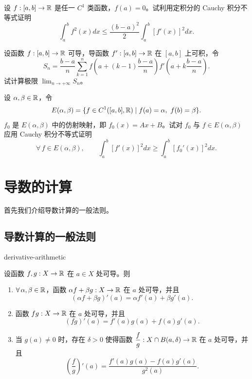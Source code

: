 \begin{exercise}
	\item 设 \(f:[a,b]\to\mathbb{R}\) 是任一 \(C^1\) 类函数，\(f(a)=0\)。试利用定积分的 Cauchy 积分不等式证明
	\[
	\int_a^b f^2(x)dx\le\frac{(b-a)^2}{2}\int_a^b[f'(x)]^2dx.
	\]
\end{exercise}

\begin{exercise}
	\item 设函数 \(f:[a,b]\to\mathbb{R}\) 可导，导函数 \(f':[a,b]\to\mathbb{R}\) 在 \([a,b]\) 上可积，令
	\[
	S_n=\frac{b-a}{n}\sum_{k=1}^n f\left(a+(k-1)\frac{b-a}{n}\right)f'\left(a+k\frac{b-a}{n}\right).
	\]
	试计算极限 \(\displaystyle\lim_{n\to+\infty}S_n\)。
\end{exercise}

\begin{exercise}
	\item 设 \(\alpha,\beta\in\mathbb{R}\)，令
	\[
	E(\alpha,\beta)=\{f\in C^1([a,b],\mathbb{R})\mid f(a)=\alpha,\ f(b)=\beta\}.
	\]
	\(f_0\) 是 \(E(\alpha,\beta)\) 中的仿射映射，即 \(f_0(x)=Ax+B\)。试对 \(f_0\) 与 \(f\in E(\alpha,\beta)\) 应用 Cauchy 积分不等式证明
	\[
	\forall\,f\in E(\alpha,\beta),\qquad\int_a^b[f'(x)]^2dx\ge\int_a^b[f_0'(x)]^2dx.
	\]
\end{exercise}

\section{导数的计算}

首先我们介绍导数计算的一般法则。

\subsection{导数计算的一般法则}
	\label{sec:6-2-1}

\begin{mythm}{}{derivative-arithmetic}

	设函数 \(f,g:X\to\mathbb{R}\) 在 \(a\in X\) 处可导。则

	\begin{enumerate}[label=\arabic*)]
		\item \(\forall\,\alpha,\beta\in\mathbb{R}\)，函数 \(\alpha f+\beta g:X\to\mathbb{R}\) 在 \(a\) 处可导，并且
		\[
		(\alpha f+\beta g)'(a)=\alpha f'(a)+\beta g'(a).
		\]

		\item 函数 \(fg:X\to\mathbb{R}\) 在 \(a\) 处可导，并且
		\[
		(fg)'(a)=f'(a)g(a)+f(a)g'(a).
		\]

		\item 当 \(g(a)\neq0\) 时，存在 \(\delta>0\) 使得函数 \(\dfrac fg:X\cap B(a,\delta)\to\mathbb{R}\) 在 \(a\) 处可导，并且
		\[
		\left(\frac fg\right)'(a)=\frac{f'(a)g(a)-f(a)g'(a)}{g^2(a)}.
		\]
	\end{enumerate}

\end{mythm}

